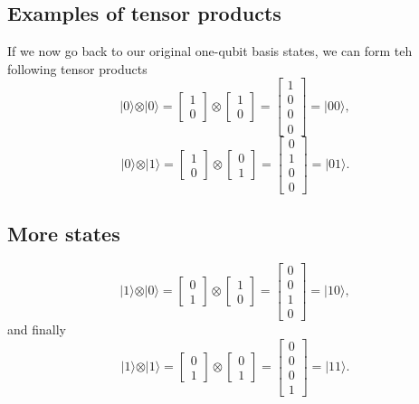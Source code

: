 \subsection{Examples of tensor products}
If we now go back to our original one-qubit basis states, we can form teh following tensor products
\[
\vert 0 \rangle \otimes \vert 0 \rangle = \begin{bmatrix} 1 \\ 0\end{bmatrix} \otimes \begin{bmatrix} 1 \\ 0\end{bmatrix} =\begin{bmatrix} 1 \\ 0 \\ 0 \\ 0 \end{bmatrix}=\vert 00 \rangle, 
\]
\[
\vert 0 \rangle \otimes \vert 1 \rangle = \begin{bmatrix} 1 \\ 0\end{bmatrix} \otimes \begin{bmatrix} 0 \\ 1\end{bmatrix} =\begin{bmatrix} 0 \\ 1 \\ 0 \\ 0 \end{bmatrix}=\vert 01 \rangle.
\]

\subsection{More states}

\[
\vert 1 \rangle \otimes \vert 0 \rangle = \begin{bmatrix} 0 \\ 1\end{bmatrix} \otimes \begin{bmatrix} 1 \\ 0\end{bmatrix} =\begin{bmatrix} 0 \\ 0 \\ 1 \\ 0 \end{bmatrix}=\vert 10 \rangle, 
\]
and finally
\[
\vert 1 \rangle \otimes \vert 1 \rangle = \begin{bmatrix} 0 \\ 1\end{bmatrix} \otimes \begin{bmatrix} 0 \\ 1\end{bmatrix} =\begin{bmatrix} 0 \\ 0 \\ 0 \\ 1 \end{bmatrix}=\vert 11 \rangle. 
\]

